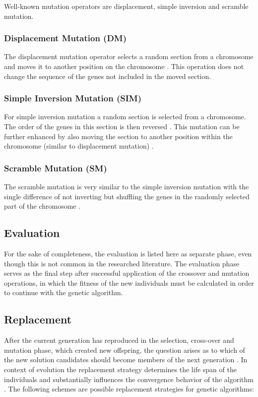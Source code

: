 \documentclass[sigconf]{acmart}
\begin{document}
Well-known mutation operators are displacement, simple inversion and scramble
mutation.

\subsubsection{Displacement Mutation (DM)}
The displacement mutation operator selects a random section from a chromosome
and moves it to another position on the chromosome \cite{Katoch2021}.
This operation does not change the sequence of the genes not included in the
moved section.

\subsubsection{Simple Inversion Mutation (SIM)}
For simple inversion mutation a random section is selected from a chromosome.
The order of the genes in this section is then reversed \cite{Katoch2021}.
This mutation can be further enhanced by also moving the section to another
position within the chromosome (similar to displacement mutation)
\cite{Katoch2021}.

\subsubsection{Scramble Mutation (SM)}
The scramble mutation is very similar to the simple inversion mutation with the
single difference of not inverting but shuffling the genes in the randomly
selected part of the chromosome \cite{Katoch2021}.


\subsection{Evaluation}
For the sake of completeness, the evaluation is listed here as separate phase,
even though this is not common in the researched literature. The evaluation
phase serves as the final step after successful application of the crossover
and mutation operations, in which the fitness of the new individuals
must be calculated in order to continue with the genetic algorithm.

\subsection{Replacement}
After the current generation has reproduced in the selection, cross-over and
mutation phase, which created new offspring, the question arises as to which
of the new solution candidates should become members of the next generation
\cite{Affenzeller2009}. In context of evolution the replacement strategy
determines the life span of the individuals and substantially influences
the convergence behavior of the algorithm \cite{Affenzeller2009}.
The following schemes are possible replacement strategies for genetic
algorithms:
\end{document}
